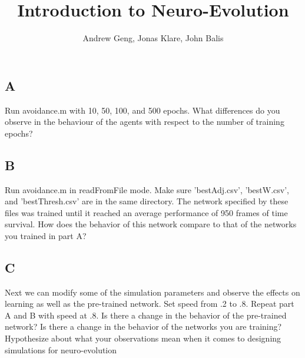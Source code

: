 \documentclass[12]{extarticle}
\begin{document}
\title{Introduction to Neuro-Evolution}
\author{Andrew Geng, Jonas Klare, John Balis}




\maketitle


\section{}

\section{}

\subsection{A}
Run avoidance.m with 10, 50, 100, and 500 epochs. What differences do you observe in the behaviour of the agents with respect to the number of training epochs?

\subsection{B}
Run avoidance.m in readFromFile mode. Make sure 'bestAdj.csv', 'bestW.csv', and 'bestThresh.csv' are in the same directory. The network specified by these files was trained until it reached an average performance of 950 frames of time survival. How does the behavior of this network compare to that of the networks you trained in part A?

\subsection{C}
Next we can modify some of the simulation parameters and observe the effects on learning as well as the pre-trained network. Set speed from .2 to .8. Repeat part A and B with speed at .8. Is there a change in the behavior of the pre-trained network? Is there a change in the behavior of the networks you are training? Hypothesize about what your observations mean when it comes to designing simulations for neuro-evolution

  
\end{document}
